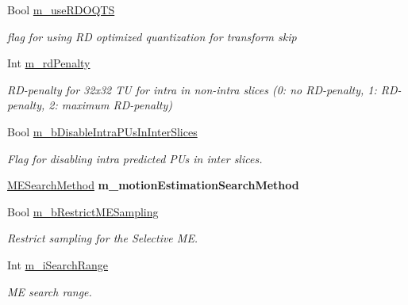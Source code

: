 \begin{DoxyCompactItemize}
Bool \hyperlink{class_t_app_enc_cfg_a3884a14af93034aaebb7db14a9477445}{m\+\_\+use\+R\+D\+O\+Q\+TS}
\begin{DoxyCompactList}\small\item\em flag for using RD optimized quantization for transform skip \end{DoxyCompactList}\item 
\mbox{\label{class_t_app_enc_cfg_adc961ed78ec7ccf9bb88b4b3c7baf22b}} 
Int \hyperlink{class_t_app_enc_cfg_adc961ed78ec7ccf9bb88b4b3c7baf22b}{m\+\_\+rd\+Penalty}
\begin{DoxyCompactList}\small\item\em R\+D-\/penalty for 32x32 TU for intra in non-\/intra slices (0\+: no R\+D-\/penalty, 1\+: R\+D-\/penalty, 2\+: maximum R\+D-\/penalty) \end{DoxyCompactList}\item 
\mbox{\label{class_t_app_enc_cfg_ad00221a365cb161fa8c702fcbb4ad553}} 
Bool \hyperlink{class_t_app_enc_cfg_ad00221a365cb161fa8c702fcbb4ad553}{m\+\_\+b\+Disable\+Intra\+P\+Us\+In\+Inter\+Slices}
\begin{DoxyCompactList}\small\item\em Flag for disabling intra predicted P\+Us in inter slices. \end{DoxyCompactList}\item 
\mbox{\label{class_t_app_enc_cfg_ae0777726606b3615593e5fba0cb46e8d}} 
\hyperlink{_type_def_8h_a8aca966885e6dbeca4cabfc3530a9bde}{M\+E\+Search\+Method} {\bfseries m\+\_\+motion\+Estimation\+Search\+Method}
\item 
\mbox{\label{class_t_app_enc_cfg_a773bc5fb9a1a542a4f39e60da6aed2d3}} 
Bool \hyperlink{class_t_app_enc_cfg_a773bc5fb9a1a542a4f39e60da6aed2d3}{m\+\_\+b\+Restrict\+M\+E\+Sampling}
\begin{DoxyCompactList}\small\item\em Restrict sampling for the Selective ME. \end{DoxyCompactList}\item 
\mbox{\label{class_t_app_enc_cfg_a1c6e944862dad9bd738650e574a2b481}} 
Int \hyperlink{class_t_app_enc_cfg_a1c6e944862dad9bd738650e574a2b481}{m\+\_\+i\+Search\+Range}
\begin{DoxyCompactList}\small\item\em ME search range. \end{DoxyCompactList}\item 

\end{DoxyCompactItemize}
